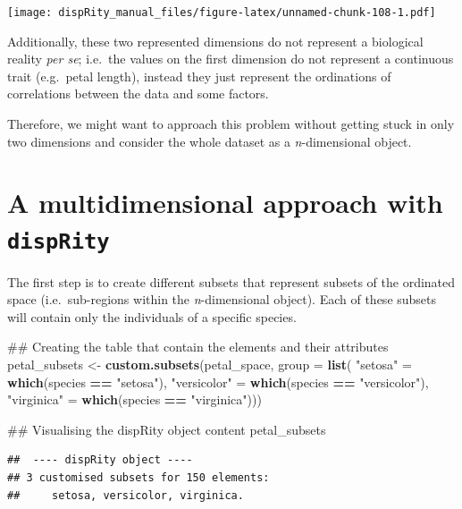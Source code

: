 \documentclass[]{book}
\newenvironment{Shaded}{\begin{snugshade}}{\end{snugshade}}
\newcommand{\KeywordTok}[1]{\textcolor[rgb]{0.13,0.29,0.53}{\textbf{#1}}}
\newcommand{\DataTypeTok}[1]{\textcolor[rgb]{0.13,0.29,0.53}{#1}}
\newcommand{\StringTok}[1]{\textcolor[rgb]{0.31,0.60,0.02}{#1}}
\newcommand{\OperatorTok}[1]{\textcolor[rgb]{0.81,0.36,0.00}{\textbf{#1}}}
\newcommand{\NormalTok}[1]{#1}
\theoremstyle{definition}
\theoremstyle{definition}
\theoremstyle{remark}
\begin{document}
\texttt{[image: dispRity\_manual\_files/figure-latex/unnamed-chunk-108-1.pdf]}

Additionally, these two represented dimensions do not represent a
biological reality \emph{per se}; i.e.~the values on the first dimension
do not represent a continuous trait (e.g.~petal length), instead they
just represent the ordinations of correlations between the data and some
factors.

Therefore, we might want to approach this problem without getting stuck
in only two dimensions and consider the whole dataset as a
\emph{n}-dimensional object.

\section{\texorpdfstring{A multidimensional approach with
\texttt{dispRity}}{A multidimensional approach with dispRity}}\label{a-multidimensional-approach-with-disprity}

The first step is to create different subsets that represent subsets of
the ordinated space (i.e.~sub-regions within the \emph{n}-dimensional
object). Each of these subsets will contain only the individuals of a
specific species.

\begin{Shaded}
\begin{Highlighting}[]
\NormalTok{## Creating the table that contain the elements and their attributes}
\NormalTok{petal_subsets <-}\StringTok{ }\KeywordTok{custom.subsets}\NormalTok{(petal_space, }\DataTypeTok{group =} \KeywordTok{list}\NormalTok{(}
                                \StringTok{"setosa"}\NormalTok{ =}\StringTok{ }\KeywordTok{which}\NormalTok{(species }\OperatorTok{==}\StringTok{ "setosa"}\NormalTok{),}
                                \StringTok{"versicolor"}\NormalTok{ =}\StringTok{ }\KeywordTok{which}\NormalTok{(species }\OperatorTok{==}\StringTok{ "versicolor"}\NormalTok{),}
                                \StringTok{"virginica"}\NormalTok{ =}\StringTok{ }\KeywordTok{which}\NormalTok{(species }\OperatorTok{==}\StringTok{ "virginica"}\NormalTok{)))}

\NormalTok{## Visualising the dispRity object content}
\NormalTok{petal_subsets}
\end{Highlighting}
\end{Shaded}

\begin{verbatim}
##  ---- dispRity object ---- 
## 3 customised subsets for 150 elements:
##     setosa, versicolor, virginica.
\end{verbatim}
\end{document}
